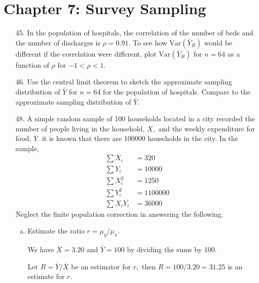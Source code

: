 \documentclass{article}
\newcommand{\var}{\mathrm{Var}}
\begin{document}
\section*{Chapter 7: Survey Sampling}
\begin{itemize}
	\item[45.] In the population of hospitals, the correlation of the number of beds and the number of discharges is $\rho=0.91.$ To see how $\var(\bar{Y}_R)$ would be different if the correlation were different, plot $\var(\bar{Y}_R)$ for $n=64$ as a function of $\rho$ for $-1<\rho<1.$

	\item[46.] Use the central limit theorem to sketch the approximate sampling distribution of $\bar{Y}$ for $n=64$ for the population of hospitals. Compare to the approximate sampling distribution of $\bar{Y}.$

	\item[48.] A simple random sample of 100 households located in a city recorded the number of people living in the household, $X,$ and the weekly expenditure for food, $Y.$ it is known that there are 100000 households in the city. In the sample, 
		\begin{align*}
			\sum X_i &= 320 \\
			\sum Y_i &= 10000 \\
			\sum X_i^2 &= 1250 \\
			\sum Y_i^2 &= 1100000 \\
			\sum X_iY_i &= 36000
		\end{align*}
		Neglect the finite population correction in answering the following.

		\begin{enumerate}[a.]
			\item Estimate the ratio $r=\mu_y/\mu_x.$
				\begin{soln}
					We have $\bar{X}=3.20$ and $\bar{Y}=100$ by dividing the sums by 100. 
					
					Let $R=\bar{Y}/\bar{X}$ be an estimator for $r,$ then $R=100/3.20=\boxed{31.25}$ is an estimate for $r.$

				\end{soln}


\end{enumerate}
\end{itemize}
\end{document}

